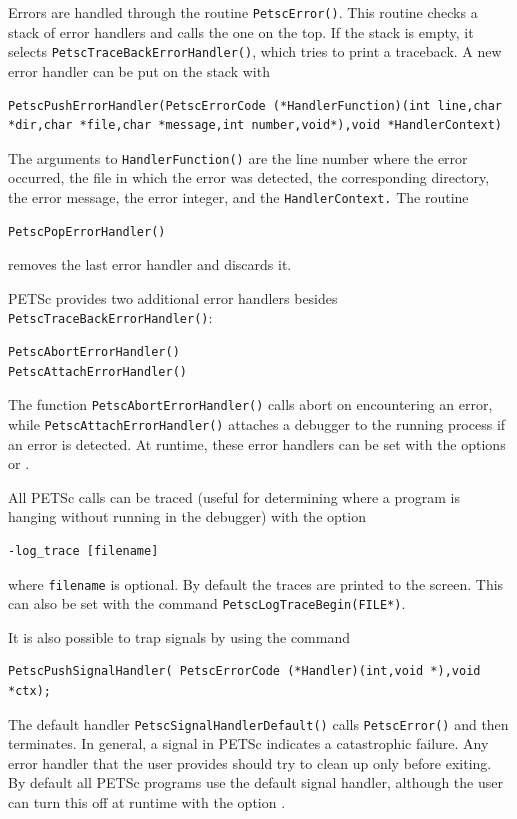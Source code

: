 {{Errors are handled through the routine \lstinline{PetscError()}.
This routine
checks a stack of error handlers and calls the one on the top.
If the stack is empty, it selects \lstinline{PetscTraceBackErrorHandler()},
which tries to print a traceback.
A new error handler can be put on the stack with
\begin{lstlisting}
PetscPushErrorHandler(PetscErrorCode (*HandlerFunction)(int line,char *dir,char *file,char *message,int number,void*),void *HandlerContext)
\end{lstlisting}
The arguments to \lstinline{HandlerFunction()} are the line number where
the error occurred, the file in which the error was detected, the corresponding
directory, the error message, the error integer, and the \lstinline{HandlerContext.}
The routine
\begin{lstlisting}
PetscPopErrorHandler()
\end{lstlisting}
removes the last error handler and discards it.

PETSc provides two additional error handlers besides
\lstinline{PetscTraceBackErrorHandler()}:
\begin{lstlisting}
PetscAbortErrorHandler()
PetscAttachErrorHandler()
\end{lstlisting}
The function \lstinline{PetscAbortErrorHandler()} calls abort on encountering an error, while
\break\lstinline{PetscAttachErrorHandler()} attaches a debugger to the running process
if an error is detected. At runtime, these error handlers can be set
with the options  or   .

All PETSc calls can be traced (useful for determining where a program is
hanging without running in the debugger) with the option
\begin{lstlisting}
-log_trace [filename]
\end{lstlisting}
where \lstinline{filename} is optional. By default the traces are printed to the
screen.  This can also be set with the
command \lstinline{PetscLogTraceBegin(FILE*)}. 

It is also possible to trap signals by using the 
command
\begin{lstlisting}
PetscPushSignalHandler( PetscErrorCode (*Handler)(int,void *),void *ctx);
\end{lstlisting}
The default handler \lstinline{PetscSignalHandlerDefault()}
calls
\lstinline{PetscError()} and then terminates. In general, a signal in PETSc
indicates a catastrophic failure.  Any error handler that the user provides
should try to clean up only before exiting.  By default all PETSc programs
use the default signal handler, although the user can turn this off
at runtime with the
option  .

}}

